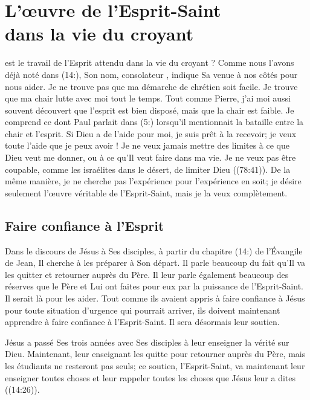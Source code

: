 \chapter[L'\oe{}uvre de l'Esprit-Saint dans la vie du croyant]{L'\oe{}uvre de l'Esprit-Saint\\ dans la vie du croyant}

 est le travail de l'Esprit
 attendu dans la vie du croyant ?
 Comme nous l'avons déjà noté dans (14:), Son nom,
 \og consolateur \fg{}, indique Sa venue à nos côtés pour nous aider.
 Je ne trouve pas que ma démarche de chrétien soit facile.
 Je trouve que ma chair lutte avec moi tout le temps.
 Tout comme Pierre, j'ai moi aussi souvent découvert que l'esprit
 est bien disposé, mais que la chair est faible.
 Je comprend ce dont Paul parlait dans (5:) lorsqu'il
 mentionnait la bataille entre la chair et l'esprit.
 Si Dieu a de l'aide pour moi, je suis prêt à la recevoir;
 je veux toute l'aide que je peux avoir !
 Je ne veux jamais mettre des limites à ce que Dieu veut me donner,
 ou à ce qu'Il veut faire dans ma vie. Je ne veux pas être coupable,
 comme les israélites dans le désert,
 de limiter Dieu ((78:41)).
 De la même manière, je ne cherche pas l'expérience
 pour l'expérience en soit; je désire seulement l'œuvre véritable
 de l'Esprit-Saint, mais je la veux complètement.

\section*{Faire confiance à l'Esprit}

Dans le discours de Jésus à Ses disciples, à partir du chapitre
 (14:) de l'Évangile de Jean,
 Il cherche à les préparer à Son départ.
 Il parle beaucoup du fait qu'Il va les quitter et retourner auprès du Père.
 Il leur parle également beaucoup des réserves que le Père et Lui
 ont faites pour eux par la puissance de l'Esprit-Saint.
 Il serait là pour les aider. Tout comme ils avaient appris à faire confiance
 à Jésus pour toute situation d'urgence qui pourrait arriver,
 ils doivent maintenant apprendre à faire confiance à l'Esprit-Saint.
 Il sera désormais leur soutien.

Jésus a passé Ses trois années avec Ses disciples à leur enseigner
 la vérité sur Dieu. Maintenant, leur enseignant les quitte pour retourner
 auprès du Père, mais les étudiants ne resteront pas seuls;
 ce soutien, l'Esprit-Saint, va maintenant leur enseigner toutes choses
 et leur rappeler toutes les choses que Jésus leur a dites
 ((14:26)).

